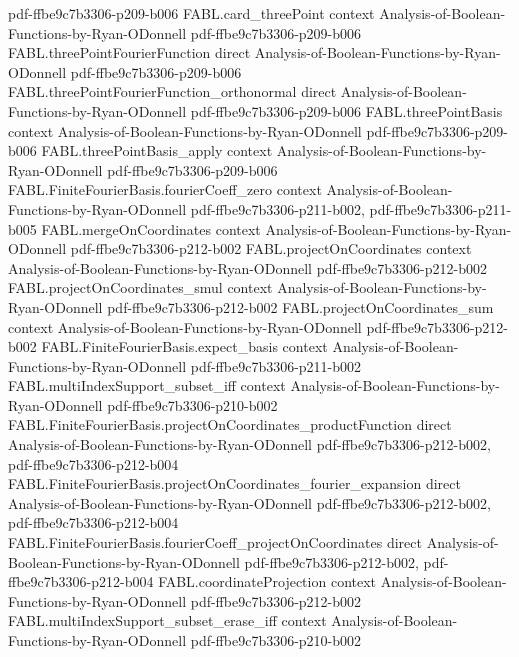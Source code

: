 \begin{theorem}
  {pdf-ffbe9c7b3306-p209-b006}
\proofstep
  {FABL.card_threePoint}
  {context}
  {Analysis-of-Boolean-Functions-by-Ryan-ODonnell}
  {pdf-ffbe9c7b3306-p209-b006}
\proofstep
  {FABL.threePointFourierFunction}
  {direct}
  {Analysis-of-Boolean-Functions-by-Ryan-ODonnell}
  {pdf-ffbe9c7b3306-p209-b006}
\proofstep
  {FABL.threePointFourierFunction_orthonormal}
  {direct}
  {Analysis-of-Boolean-Functions-by-Ryan-ODonnell}
  {pdf-ffbe9c7b3306-p209-b006}
\proofstep
  {FABL.threePointBasis}
  {context}
  {Analysis-of-Boolean-Functions-by-Ryan-ODonnell}
  {pdf-ffbe9c7b3306-p209-b006}
\proofstep
  {FABL.threePointBasis_apply}
  {context}
  {Analysis-of-Boolean-Functions-by-Ryan-ODonnell}
  {pdf-ffbe9c7b3306-p209-b006}
\proofstep
  {FABL.FiniteFourierBasis.fourierCoeff_zero}
  {context}
  {Analysis-of-Boolean-Functions-by-Ryan-ODonnell}
  {pdf-ffbe9c7b3306-p211-b002,
    pdf-ffbe9c7b3306-p211-b005}
\proofstep
  {FABL.mergeOnCoordinates}
  {context}
  {Analysis-of-Boolean-Functions-by-Ryan-ODonnell}
  {pdf-ffbe9c7b3306-p212-b002}
\proofstep
  {FABL.projectOnCoordinates}
  {context}
  {Analysis-of-Boolean-Functions-by-Ryan-ODonnell}
  {pdf-ffbe9c7b3306-p212-b002}
\proofstep
  {FABL.projectOnCoordinates_smul}
  {context}
  {Analysis-of-Boolean-Functions-by-Ryan-ODonnell}
  {pdf-ffbe9c7b3306-p212-b002}
\proofstep
  {FABL.projectOnCoordinates_sum}
  {context}
  {Analysis-of-Boolean-Functions-by-Ryan-ODonnell}
  {pdf-ffbe9c7b3306-p212-b002}
\proofstep
  {FABL.FiniteFourierBasis.expect_basis}
  {context}
  {Analysis-of-Boolean-Functions-by-Ryan-ODonnell}
  {pdf-ffbe9c7b3306-p211-b002}
\proofstep
  {FABL.multiIndexSupport_subset_iff}
  {context}
  {Analysis-of-Boolean-Functions-by-Ryan-ODonnell}
  {pdf-ffbe9c7b3306-p210-b002}
\proofstep
  {FABL.FiniteFourierBasis.projectOnCoordinates_productFunction}
  {direct}
  {Analysis-of-Boolean-Functions-by-Ryan-ODonnell}
  {pdf-ffbe9c7b3306-p212-b002,
    pdf-ffbe9c7b3306-p212-b004}
\proofstep
  {FABL.FiniteFourierBasis.projectOnCoordinates_fourier_expansion}
  {direct}
  {Analysis-of-Boolean-Functions-by-Ryan-ODonnell}
  {pdf-ffbe9c7b3306-p212-b002,
    pdf-ffbe9c7b3306-p212-b004}
\proofstep
  {FABL.FiniteFourierBasis.fourierCoeff_projectOnCoordinates}
  {direct}
  {Analysis-of-Boolean-Functions-by-Ryan-ODonnell}
  {pdf-ffbe9c7b3306-p212-b002,
    pdf-ffbe9c7b3306-p212-b004}
\proofstep
  {FABL.coordinateProjection}
  {context}
  {Analysis-of-Boolean-Functions-by-Ryan-ODonnell}
  {pdf-ffbe9c7b3306-p212-b002}
\proofstep
  {FABL.multiIndexSupport_subset_erase_iff}
  {context}
  {Analysis-of-Boolean-Functions-by-Ryan-ODonnell}
  {pdf-ffbe9c7b3306-p210-b002}

\end{theorem}

